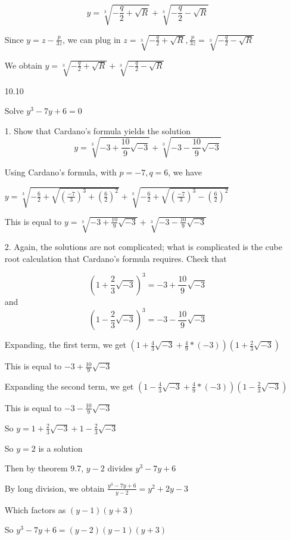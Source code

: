 \documentclass[12pt]{article}
\begin{document}
\begin{itemize}
	$$y = \sqrt[3]{-\frac{q}{2} + \sqrt{R}} + \sqrt[3]{-\frac{q}{2} - \sqrt{R}}$$

	Since $y = z - \frac{p}{3z}$, we can plug in $z = \sqrt[3]{-\frac{q}{2} + \sqrt{R}}, \frac{p}{3z} = \sqrt[3]{-\frac{q}{2} - \sqrt{R}}$

	We obtain $y = \sqrt[3]{-\frac{q}{2} + \sqrt{R}} + \sqrt[3]{-\frac{q}{2} - \sqrt{R}}$



	
\newpage

\item[10.10]

	Solve $y^3 - 7y + 6 = 0$

	1. Show that Cardano's formula yields the solution $$y = \sqrt[3]{-3 + \frac{10}{9}\sqrt{-3}} + \sqrt[3]{-3 -\frac{10}{9}\sqrt{-3}}$$

	Using Cardano's formula, with $p = -7, q = 6$, we have 

	$y = \sqrt[3]{-\frac{6}{2} + \sqrt{(\frac{-7}{3})^3 + (\frac{6}{2})^2}} + \sqrt[3]{-\frac{6}{2} + \sqrt{(\frac{-7}{3})^3 - (\frac{6}{2})^2}}$

	This is equal to $y = \sqrt[3]{-3 + \frac{10}{9}\sqrt{-3}} + \sqrt[3]{-3 - \frac{10}{9}\sqrt{-3}}$

	2. Again, the solutions are not complicated; what is complicated is the cube root calculation that Cardano's formula requires. Check that

	$$(1 + \frac{2}{3}\sqrt{-3})^3 = -3 + \frac{10}{9}\sqrt{-3}$$ and $$(1 - \frac{2}{3}\sqrt{-3})^3 = -3 - \frac{10}{9}\sqrt{-3}$$

	Expanding, the first term, we get $(1 + \frac{4}{3}\sqrt{-3} + \frac{4}{9}*(-3))(1+\frac{2}{3}\sqrt{-3})$

	This is equal to $-3 + \frac{10}{9}\sqrt{-3}$

	Expanding the second term, we get $(1 - \frac{4}{3}\sqrt{-3} + \frac{4}{9}*(-3))(1 - \frac{2}{3}\sqrt{-3})$

	This is equal to $-3 - \frac{10}{9}\sqrt{-3}$

	So $y = 1 + \frac{2}{3} \sqrt{-3} + 1 - \frac{2}{3}\sqrt{-3}$

	So $y = 2$ is a solution

	Then by theorem 9.7, $y - 2$ divides $y^3 - 7y + 6$

	By long division, we obtain $\frac{y^3 - 7y + 6}{y-2} = y^2 + 2y -3$

	Which factors as $(y-1)(y+3)$

	So $y^3 - 7y + 6 = (y-2)(y-1)(y+3)$


\end{itemize}
\end{document}

